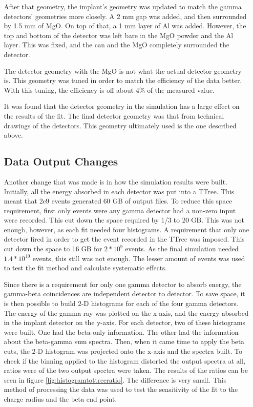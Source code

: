 \documentclass[../MaxHughesThesis.tex]{subfiles}
\begin{document}
After that geometry, the implant's geometry was updated to match the gamma detectors' geometries more closely.
A 2 mm gap was added, and then surrounded by 1.5 mm of MgO. 
On top of that, a 1 mm layer of Al was added.
However, the top and bottom of the detector was left bare in the MgO powder and the Al layer.
This was fixed, and the can and the MgO completely surrounded the detector.

The detector geometry with the MgO is not what the actual detector geometry is.
This geometry was tuned in order to match the efficiency of the data better.
With this tuning, the efficiency is off about 4\% of the measured value. 

It was found that the detector geometry in the simulation has a large effect on the results of the fit.
The final detector geometry was that from technical drawings of the detectors.
This geometry ultimately used  is the one described above. 

\subsection{Data Output Changes}
Another change that was made is in how the simulation results were built.
Initially, all the energy absorbed in each detector was put into a TTree.
This meant that 2e9 events generated 60 GB of output files.
To reduce this space requirement, first only events were any gamma detector had a non-zero input were recorded.
This cut down the space required by 1/3 to 20 GB.
This was not enough, however, as each fit needed four histograms.
A requirement that only one detector fired in order to get the event recorded in the TTree was imposed. 
This cut down the space to 16 GB for $2 * 10^{9}$ events.
As the final simulation needed $1.4 * 10^{10}$ events, this still was not enough.
The lesser amount of events was used to test the fit method and calculate systematic effects.

Since there is a requirement for only one gamma detector to absorb energy, the gamma-beta coincidences are independent detector to detector.
To save space, it is then possible to build 2-D histograms for each of the four gamma detectors.
The energy of the gamma ray was plotted on the x-axis, and the energy absorbed in the implant detector on the y-axis. 
For each detector, two of these histograms were built.
One had the beta-only information.
The other had the information about the beta-gamma sum spectra.
Then, when it came time to apply the beta cuts, the 2-D histogram was projected onto the x-axis and the spectra built.
To check if the binning applied to the histogram distorted the output spectra at all, ratios were of the two output spectra were taken.
The results of the ratios can be seen in figure \ref{fig:histogramtottreeratio}.
The difference is very small.
This method of processing the data was used to test the sensitivity of the fit to the charge radius and the beta end point.
\end{document}
